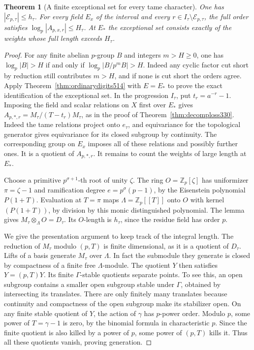 \documentclass[a4paper,11pt]{article}
\newtheorem{theorem}[proposition]{Theorem}
\theoremstyle{definition}
\theoremstyle{remark}
\newcommand{\ZZ}{\mathbb Z}\newcommand{\ord}{\operatorname{ord}}
\numberwithin{equation}{section}
\begin{document}
\begin{theorem}[A finite exceptional set for every tame character]
\leavevmode\label{thm:finiteweights515}
One has \(|\mathcal E_{p,\tau}|\le h_\tau\).
For every field \(E_x\) of the interval and every
\(r\in I_\tau\setminus\mathcal E_{p,\tau}\), the full order satisfies
\(\log_p|A_{p,x,r}|\le H_\tau\).
At \(E_*\) the exceptional set consists exactly of the weights
whose full length exceeds \(H_\tau\).
\end{theorem}
\begin{proof}
For any finite abelian \(p\)-group \(B\) and integers \(m>H\ge0\),
one has \(\log_p|B|>H\) if and only if \(\log_p|B/p^mB|>H\).
Indeed any cyclic factor cut short by reduction still contributes
\(m>H\), and if none is cut short the orders agree. Apply
Theorem~\ref{thm:ordinarydigits514} with \(E=E_*\) to prove the
exact identification of the exceptional set. In the progression
\(I_\tau\), put \(t_r=a^{-r}-1\). Imposing the field and scalar
relations on \(X\) first over \(E_*\) gives
\(A_{p,*,r}=M_\tau/(T-t_r)M_\tau\), as in the proof of
Theorem~\ref{thm:decomploss330}. Indeed the tame relations
project onto \(e_\tau\), and equivariance for the topological
generator gives equivariance for its closed subgroup by continuity.
The corresponding group on \(E_x\) imposes all of these relations
and possibly further ones. It is a quotient of \(A_{p,*,r}\).
It remains to count the weights of large length at \(E_*\).

Choose a primitive \(p^{\sigma+1}\)-th root of unity \(\zeta\).
The ring \(O=\ZZ_p[\zeta]\) has uniformizer \(\pi=\zeta-1\) and
ramification degree \(e=p^\sigma(p-1)\), by the Eisenstein
polynomial \(P(1+T)\). Evaluation at \(T=\pi\) maps
\(\Lambda=\ZZ_p[[T]]\) onto \(O\) with kernel \((P(1+T))\),
by division by this monic distinguished polynomial. The lemma
gives \(M_\tau\otimes_\Lambda O=D_\tau\). Its \(O\)-length is
\(h_\tau\), since the residue field has order \(p\).

We give the presentation argument to keep track of the integral
length. The reduction of \(M_\tau\) modulo \((p,T)\) is finite
dimensional, as it is a quotient of \(D_\tau\). Lifts of a basis
generate \(M_\tau\) over \(\Lambda\). In fact the submodule they
generate is closed by compactness of a finite free \(\Lambda\)-module.
The quotient \(Y\) then satisfies \(Y=(p,T)Y\). Its finite
\(\Gamma\)-stable quotients separate points. To see this, an
open subgroup contains a smaller open subgroup stable under
\(\Gamma\), obtained by intersecting its translates. There are
only finitely many translates because continuity and compactness
of the open subgroup make its stabilizer open. On any finite
stable quotient of \(Y\), the action of \(\gamma\) has \(p\)-power
order. Modulo \(p\), some power of \(T=\gamma-1\) is zero, by
the binomial formula in characteristic \(p\). Since the finite
quotient is also killed by a power of \(p\), some power of
\((p,T)\) kills it. Thus all these quotients vanish, proving
generation.


\end{proof}
\end{document}

